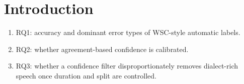 \section{Introduction}

\begin{enumerate}
\item RQ1: accuracy and dominant error types of WSC-style automatic labels.
\item RQ2: whether agreement-based confidence is calibrated. 
\item RQ3: whether a \FilterThr{} confidence filter disproportionately removes dialect-rich speech once duration and split are controlled.
\end{enumerate}
